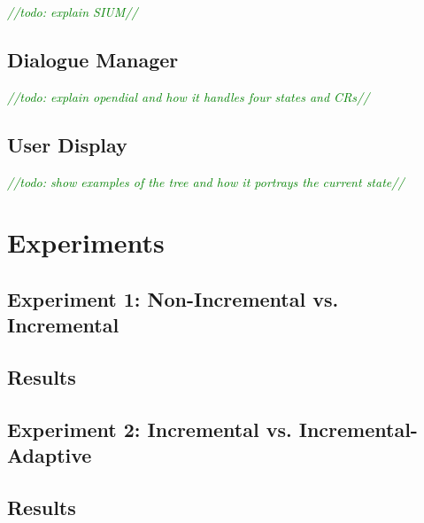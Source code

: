 \documentclass[a4paper,11pt]{article}
\newcommand{\todo}[1]{\textcolor{green}{\emph{//todo: #1//}}}
\begin{document}
\todo{explain SIUM}

\subsection{Dialogue Manager}

\todo{explain opendial and how it handles four states and CRs}

\subsection{User Display}

\todo{show examples of the tree and how it portrays the current state}

\section{Experiments}
\label{section:experiments}

\subsection{Experiment 1: Non-Incremental vs. Incremental}
\label{section:exp1}

\subsection{Results}

\subsection{Experiment 2: Incremental vs. Incremental-Adaptive}
\label{section:exp2}

\subsection{Results}

% 
% 
\end{document}
